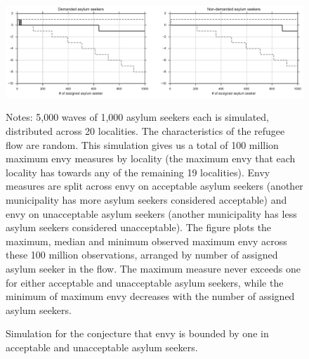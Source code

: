 \documentclass[12pt,fleqn]{article}
\begin{document}
\begin{figure}
	\caption{Simulation for the conjecture that envy is bounded by one in acceptable and unacceptable asylum seekers.\label{FIG:conjecture_1}}
	\begin{center}
		\includegraphics[width=\linewidth]{figs/conjecture/both.pdf}
	\end{center}
		{\scriptsize \vspace{-1em}
	\begin{singlespace}
		{\sc Notes:} 5,000 waves of 1,000 asylum seekers each is simulated, distributed across 20 localities. The characteristics of the refugee flow are random. This simulation gives us a total of 100 million maximum envy measures by locality (the maximum envy that each locality has towards any of the remaining 19 localities). Envy measures are split across envy on acceptable asylum seekers (another municipality has more asylum seekers considered acceptable) and envy on unacceptable asylum seekers (another municipality has less asylum seekers considered unacceptable). The figure plots the maximum, median and minimum observed maximum envy across these 100 million observations, arranged by number of assigned asylum seeker in the flow. The maximum measure never exceeds one for either acceptable and unacceptable asylum seekers, while the minimum of maximum envy decreases with the number of assigned asylum seekers.
	\end{singlespace}
	 }
\end{figure}
\end{document}
